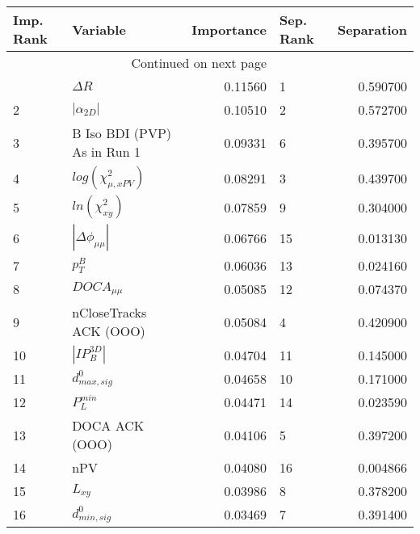 \usepackage{lscape}

\begin{landscape}
\begin{longtable}{llrlr}
\toprule
Imp. Rank &                     Variable &  Importance & Sep. Rank &  Separation \\
\midrule
\endhead
\midrule
\multicolumn{3}{r}{{Continued on next page}} \\
\midrule
\endfoot

\bottomrule
\endlastfoot
        1 &                   $\Delta R$ &     0.11560 &         1 &    0.590700 \\
        2 &              $|\alpha_{2D}|$ &     0.10510 &         2 &    0.572700 \\
        3 &  B Iso BDI (PVP) As in Run 1 &     0.09331 &         6 &    0.395700 \\
        4 &    $log(\chi^{2}_{\mu,xPV})$ &     0.08291 &         3 &    0.439700 \\
        5 &          $ln(\chi^{2}_{xy})$ &     0.07859 &         9 &    0.304000 \\
        6 &     $|\Delta \phi_{\mu\mu}|$ &     0.06766 &        15 &    0.013130 \\
        7 &                    $p^B_{T}$ &     0.06036 &        13 &    0.024160 \\
        8 &              $DOCA_{\mu\mu}$ &     0.05085 &        12 &    0.074370 \\
        9 &       nCloseTracks ACK (OOO) &     0.05084 &         4 &    0.420900 \\
       10 &              $|IP_{B}^{3D}|$ &     0.04704 &        11 &    0.145000 \\
       11 &             $d^0_{max, sig}$ &     0.04658 &        10 &    0.171000 \\
       12 &                $P^{min}_{L}$ &     0.04471 &        14 &    0.023590 \\
       13 &               DOCA ACK (OOO) &     0.04106 &         5 &    0.397200 \\
       14 &                          nPV &     0.04080 &        16 &    0.004866 \\
       15 &                     $L_{xy}$ &     0.03986 &         8 &    0.378200 \\
       16 &             $d^0_{min, sig}$ &     0.03469 &         7 &    0.391400 \\
\end{longtable}

\end{landscape}
